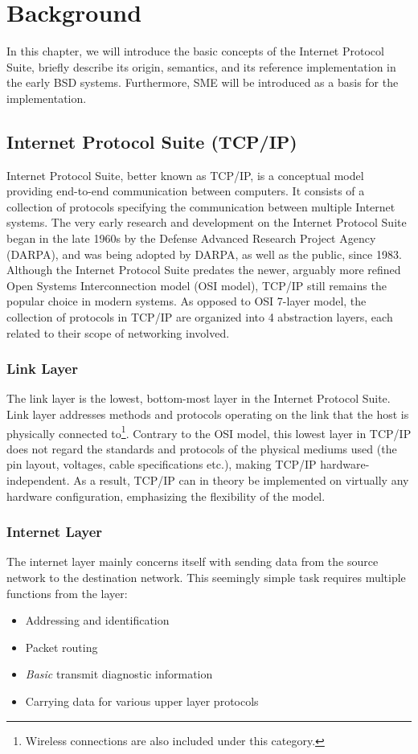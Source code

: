 \chapter{Background}

In this chapter, we will introduce the basic concepts of the Internet Protocol
Suite, briefly describe its origin, semantics, and its reference implementation
in the early BSD systems.
Furthermore, SME will be introduced as a basis for the implementation.


\section{Internet Protocol Suite (TCP/IP)}
Internet Protocol Suite, better known as TCP/IP, is a conceptual model providing
end-to-end communication between computers. It consists of a collection of
protocols specifying the communication between multiple Internet systems\cite{RFC1122}.
The very early research and development on the Internet Protocol Suite began in 
the late 1960s by the Defense Advanced Research Project Agency (DARPA),
and was being adopted by DARPA, as well as the public, since 1983\cite{DARPA_internet}. 
Although the Internet Protocol Suite predates the newer, arguably more refined
Open Systems Interconnection model (OSI model), TCP/IP still remains the popular
choice in modern systems.
As opposed to OSI 7-layer model\cite{X.200}, the collection of protocols in TCP/IP are 
organized into 4 abstraction layers, each related to their scope of networking 
involved.

\subsection{Link Layer}
The link layer is the lowest, bottom-most layer in the Internet Protocol Suite.
Link layer addresses methods and protocols operating on the link that the host
is physically connected to\footnote{Wireless connections are also included 
under this category.}. Contrary to the OSI model, this lowest layer in TCP/IP 
does not regard the standards and protocols of the physical mediums used (the
pin layout, voltages, cable specifications etc.), making TCP/IP hardware-independent.
As a result, TCP/IP can in theory be implemented on virtually any hardware
configuration, emphasizing the flexibility of the model.

\subsection{Internet Layer}
The internet layer mainly concerns itself with sending data from the source 
network to the destination network. This seemingly simple task requires multiple
functions from the layer:
\begin{itemize}
    \item Addressing and identification
    \item Packet routing
    \item \emph{Basic} transmit diagnostic information
    \item Carrying data for various upper layer protocols
\end{itemize}


